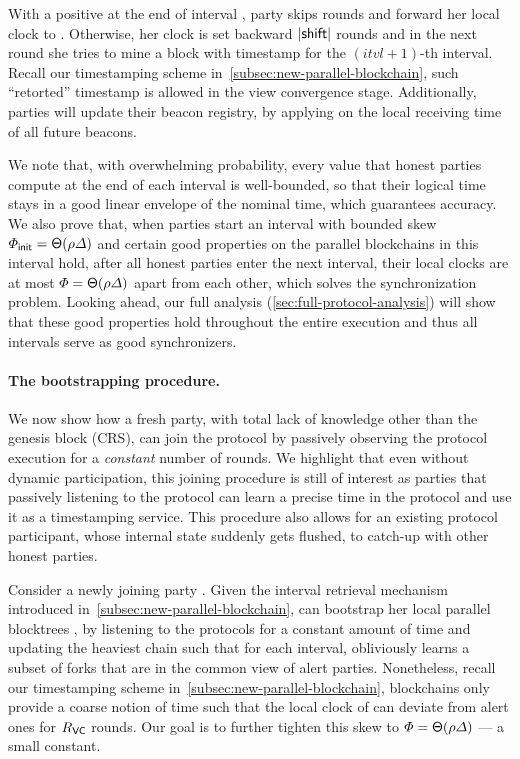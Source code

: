 With a positive \shift at the end of interval \interval, party \party skips \shift rounds and forward her local clock to .
%
Otherwise, her clock is set backward $|\mathsf{shift}|$ rounds and in the next round she tries to mine a block with timestamp  for the $(itvl + 1)$-th interval.
%
Recall our timestamping scheme in~\cref{subsec:new-parallel-blockchain}, such ``retorted'' timestamp is allowed in the view convergence stage.
%
Additionally, parties will update their beacon registry, by applying \shift on the local receiving time of all future beacons.

We note that, with overwhelming probability, every \shift value that honest parties compute at the end of each interval is well-bounded, so that their logical time stays in a good linear envelope of the nominal time, which guarantees accuracy.
%
We also prove that, when parties start an interval with bounded skew $\varPhi_{\mathsf{init}} = \mathsf{\Theta}(\rho \varDelta)$ and certain good properties on the parallel blockchains in this interval hold, after all honest parties enter the next interval, their local clocks are at most $\varPhi = \mathsf{\Theta}(\rho \varDelta)$ apart from each other, which solves the synchronization problem.
%
Looking ahead, our full analysis (\cref{sec:full-protocol-analysis}) will show that these good properties hold throughout the entire execution and thus all intervals serve as good synchronizers.

\paragraph{The bootstrapping procedure.}
%
We now show how a fresh party, with total lack of knowledge other than the genesis block (CRS), can join the \pSMR protocol by passively observing the protocol execution for a \emph{constant} number of rounds.
%
We highlight that even without dynamic participation, this joining procedure is still of interest as parties that passively listening to the protocol can learn a precise time in the protocol and use it as a timestamping service.
%
This procedure also allows for an existing protocol participant, whose internal state suddenly gets flushed, to catch-up with other honest parties.

Consider a newly joining party \newParty.
%
Given the interval retrieval mechanism introduced in~\cref{subsec:new-parallel-blockchain}, \newParty can bootstrap her local parallel blocktrees \parallelTreesLocal, by listening to the protocols for a constant amount of time and updating the heaviest chain such that for each interval, \newParty obliviously learns a subset of forks that are in the common view of alert parties.
%
Nonetheless, recall our timestamping scheme in~\cref{subsec:new-parallel-blockchain}, blockchains only provide a coarse notion of time such that the local clock of \newParty can deviate from alert ones for $R_{\mathsf{VC}}$ rounds.
%
Our goal is to further tighten this skew to $\varPhi = \mathsf{\Theta}(\rho \varDelta)$ --- a small constant.

